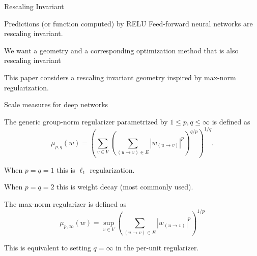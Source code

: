 \documentclass[presentation,xcolor={usenames,dvipsnames},10pt]{beamer}
\begin{document}
\begin{frame}{Rescaling Invariant}

\bit 
\item Predictions (or function computed) by RELU Feed-forward neural networks are rescaling invariant.
\item We want a geometry and a corresponding optimization method that is also rescaling invariant 

\item This paper considers a rescaling invariant geometry inspired by max-norm regularization.

\eit 

\end{frame}


\begin{frame}{Scale measures for deep networks}
\begin{definition}
The generic group-norm regularizer
parametrized by $1\leq p,q \leq\infty$ is defined as
\begin{equation*}
\label{eq:mu}
\mu_{p,q}(w) = \left(\sum_{v \in V}\left(\sum_{(u\rightarrow v) \in E} \left\lvert w_{(u\rightarrow v)}\right\rvert ^p\right)^{q/p}\right)^{1/q}.
\end{equation*} 
\end{definition}

\bit
\item When $p=q=1$ this is $\ell_1$ regularization. 
\item When $p=q=2$ this is weight decay (most commonly used). 
\eit 

\begin{definition}
The max-norm regularizer is defined as 
\begin{equation*}
\label{eq:mu}
\mu_{p,\infty}(w) =\sup_{v \in V}\left(\sum_{(u\rightarrow v) \in E} \left\lvert w_{(u\rightarrow v)}\right\rvert ^p\right)^{1/p}
\end{equation*}

This is equivalent to setting $q=\infty$ in the per-unit regularizer. 
\end{definition}
\end{frame}
\end{document}
